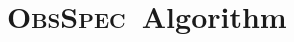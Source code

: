 \documentclass{article} %
\newcommand{\method}{\textsc{ObsSpec}}
\begin{document}


\raggedbottom



\appendix
\makeatletter
\setlength{\@fptop}{0pt}
\setlength{\@fpsep}{18pt}
\makeatother
\section{\method\ Algorithm}
\label{sec:rollout-algorithm}
\end{document}
